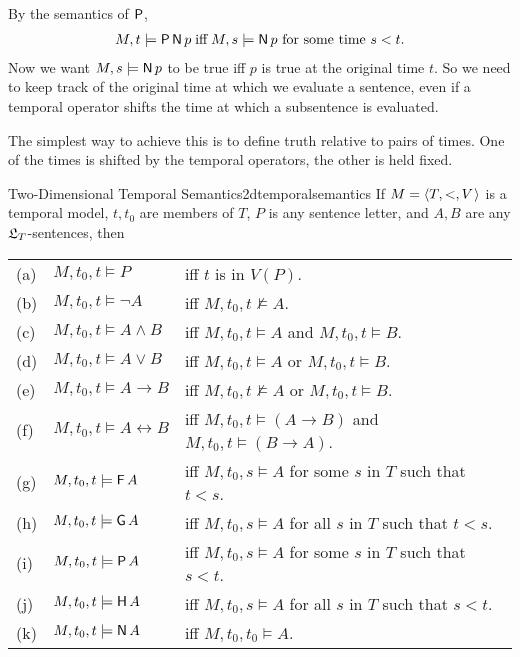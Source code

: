 By the semantics of $\operatorname{\mathsf{P}}$,%
\begin{align*}
  M,t \models \tP \tN p \;\text{iff} \;\text{$M,s \models \tN p$ for some time $s < t$}.
\end{align*}
Now we want $M,s\models \tN p$ to be true iff $p$ is true at the original time
$t$. So we need to keep track of the original time at which we evaluate a
sentence, even if a temporal operator shifts the time at which a subsentence is
evaluated.

The simplest way to achieve this is to define truth relative to pairs of
times. One of the times is shifted by the temporal operators, the other is held
fixed.

\begin{definition}{Two-Dimensional Temporal Semantics}{2dtemporalsemantics}
  If $\Mfr = \t{T,<,V}$ is a temporal model, $t,t_0$ are members of $T$, $P$ is
  any sentence letter, and $A,B$ are any $\mathfrak{L}_T$-sentences, then

  \medskip
  \begin{tabular}{lll}
    (a) & $M,t_0,t \models P$ &iff $t$ is in $V(P)$.\\
    (b) & $M,t_0,t \models \neg A$ &iff $M,t_0,t \not\models A$.\\
    (c) & $M,t_0,t \models A \land B$ &iff $M,t_0,t \models A$ and $M,t_0,t \models B$.\\
    (d) & $M,t_0,t \models A \lor B$ &iff $M,t_0,t \models A$ or $M,t_0,t \models B$.\\
    (e) & $M,t_0,t \models A \to B$ &iff $M,t_0,t \not\models A$ or $M,t_0,t \models B$.\\
    (f) & $M,t_0,t \models A \leftrightarrow B$ &iff $M,t_0,t \models (A\to B)$ and $M,t_0,t \models (B\to A)$.\\
    (g) & $M,t_0,t \models \tF A$ &iff $M,t_0,s \models A$ for some $s$ in $ T$ such that $t<s$.\\
    (h) & $M,t_0,t \models \tG A$ &iff $M,t_0,s \models A$ for all $s$ in $ T$ such that $t<s$.\\
    (i) & $M,t_0,t \models \tP A$ &iff $M,t_0,s \models A$ for some $s$ in $ T$ such that $s<t$.\\
    (j) & $M,t_0,t \models \tH A$ &iff $M,t_0,s \models A$ for all $s$ in $ T$ such that $s<t$.\\
    (k) & $M,t_0,t \models \tN A$ &iff $M,t_0,t_0 \models A$.
  \end{tabular}
\end{definition}

